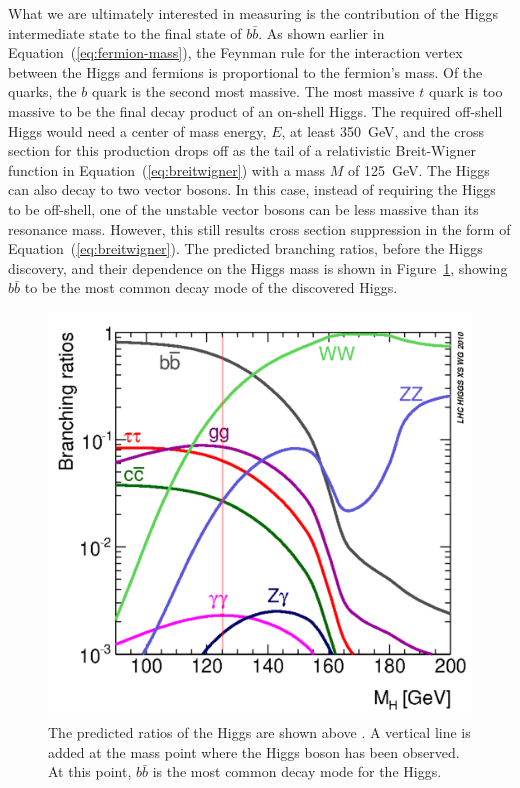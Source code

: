 What we are ultimately interested in measuring is the contribution of the
Higgs intermediate state to the final state of $b\bar{b}$.
As shown earlier in Equation~(\ref{eq:fermion-mass}),
the Feynman rule for the interaction vertex between the Higgs and fermions
is proportional to the fermion's mass.
Of the quarks, the $b$ quark is the second most massive.
The most massive $t$ quark is too massive to be the final decay product of an on-shell Higgs.
The required off-shell Higgs would need a center of mass energy, $E$, at least \SI{350}{GeV},
and the cross section for this production drops off as the tail of a relativistic Breit-Wigner function
in Equation~(\ref{eq:breitwigner}) with a mass $M$ of \SI{125}{GeV}.
The Higgs can also decay to two vector bosons.
In this case, instead of requiring the Higgs to be off-shell,
one of the unstable vector bosons can be less massive than its resonance mass.
However, this still results cross section suppression in the form of Equation~(\ref{eq:breitwigner}).
The predicted branching ratios, before the Higgs discovery,
and their dependence on the Higgs mass is shown in Figure~\ref{fig:brs},
showing $b\bar{b}$ to be the most common decay mode of the discovered Higgs.
%
\begin{figure}
  \centering
  \includegraphics[width=0.5\linewidth]{figures/YRHXS_BR_fig1.pdf}
  \caption[Predicted ratios of Higgs decay]{
    The predicted ratios of the Higgs are shown above \cite{dittmaier2012handbook}.
    A vertical line is added at the mass point where the Higgs boson has been observed.
    At this point, $b\bar{b}$ is the most common decay mode for the Higgs.
  }
  \label{fig:brs}
\end{figure}

